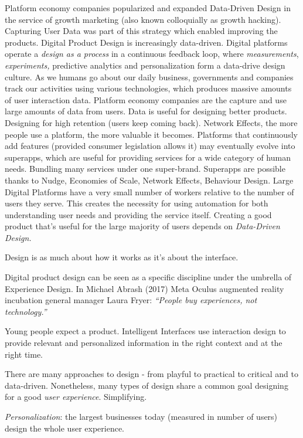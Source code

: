 \documentclass[
  letterpaper,
  DIV=11,
  numbers=noendperiod]{scrartcl}
\begin{document}
Platform economy companies popularized and expanded Data-Driven Design
in the service of growth marketing (also known colloquially as growth
hacking). Capturing User Data was part of this strategy which enabled
improving the products. Digital Product Design is increasingly
data-driven. Digital platforms operate a \emph{design as a process} in a
continuous feedback loop, where \emph{measurements}, \emph{experiments,}
predictive analytics and personalization form a data-drive design
culture. As we humans go about our daily business, governments and
companies track our activities using various technologies, which
produces massive amounts of user interaction data. Platform economy
companies are the capture and use large amounts of data from users. Data
is useful for designing better products. Designing for high retention
(users keep coming back). Network Effects, the more people use a
platform, the more valuable it becomes. Platforms that continuously add
features (provided consumer legislation allows it) may eventually evolve
into superapps, which are useful for providing services for a wide
category of human needs. Bundling many services under one super-brand.
Superapps are possible thanks to Nudge, Economies of Scale, Network
Effects, Behaviour Design. Large Digital Platforms have a very small
number of workers relative to the number of users they serve. This
creates the necessity for using automation for both understanding user
needs and providing the service itself. Creating a good product that's
useful for the large majority of users depends on \emph{Data-Driven
Design.}

Design is as much about how it works as it's about the interface.

Digital product design can be seen as a specific discipline under the
umbrella of Experience Design. In Michael Abrash (2017) Meta Oculus
augmented reality incubation general manager Laura Fryer: \emph{``People
buy experiences, not technology.''}

Young people expect a product. Intelligent Interfaces use interaction
design to provide relevant and personalized information in the right
context and at the right time.

There are many approaches to design - from playful to practical to
critical and to data-driven. Nonetheless, many types of design share a
common goal designing for a good \emph{user experience}. Simplifying.

\emph{Personalization}: the largest businesses today (measured in number
of users) design the whole user experience.
\end{document}
